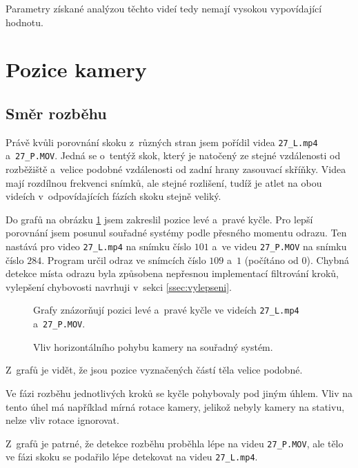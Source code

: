 Parametry získané analýzou těchto videí tedy nemají vysokou vypovídající hodnotu.




\section{Pozice kamery}

\subsection{Směr rozběhu}

Právě kvůli porovnání skoku z~různých stran jsem pořídil videa \texttt{27\_L.mp4} a~\texttt{27\_P.MOV}. Jedná se o~tentýž skok, který je natočený ze stejné vzdálenosti od rozběžiště a~velice podobné vzdálenosti od zadní hrany zasouvací skříňky. Videa mají rozdílnou frekvenci snímků, ale stejné rozlišení, tudíž je atlet na obou videích v~odpovídajících fázích skoku stejně veliký.

Do grafů na obrázku \ref{fig:strany} jsem zakreslil pozice levé a~pravé kyčle. Pro lepší porovnání jsem posunul souřadné systémy podle přesného momentu odrazu. Ten nastává pro video \texttt{27\_L.mp4} na snímku číslo $101$ a~ve videu \texttt{27\_P.MOV} na snímku číslo $284$. Program určil odraz ve snímcích číslo $109$ a~$1$ (počítáno od $0$). Chybná detekce místa odrazu byla způsobena nepřesnou implementací filtrování kroků, vylepšení chybovosti navrhuji v~sekci \ref{ssec:vylepseni}.

\begin{figure}[h]\centering
    \caption{Vliv horizontálního pohybu kamery na souřadný systém.}
    \small
    Grafy znázorňují pozici levé a~pravé kyčle ve videích \texttt{27\_L.mp4} a~\texttt{27\_P.MOV}.
    \label{fig:strany}
\end{figure}

Z~grafů je vidět, že jsou pozice vyznačených částí těla velice podobné.

Ve fázi rozběhu jednotlivých kroků se kyčle pohybovaly pod jiným úhlem. Vliv na tento úhel má například mírná rotace kamery, jelikož nebyly kamery na stativu, nelze vliv rotace ignorovat.

Z~grafů je patrné, že detekce rozběhu proběhla lépe na videu \texttt{27\_P.MOV}, ale tělo ve fázi skoku se podařilo lépe detekovat na videu \texttt{27\_L.mp4}.

